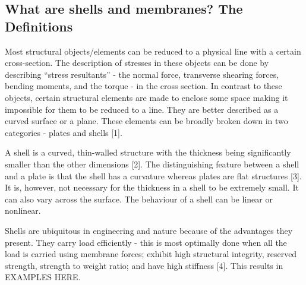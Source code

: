 \documentclass[../main.tex]{subfiles}
\begin{document}
\subsection{What are shells and membranes? The Definitions}
Most structural objects/elements can be reduced to a physical line with a certain cross-section. The description of stresses in these objects can be done by describing
 “stress resultants” - the normal force, transverse shearing forces, bending moments, and the torque - in the cross section. In contrast to these objects,
 certain structural elements are made to enclose some space making it impossible for them to be reduced to a line. They are better described as a curved surface or a plane.
 These elements can be broadly broken down in two categories - plates and shells [1].

A shell is a curved, thin-walled structure with the thickness being significantly smaller than the other dimensions [2]. The distinguishing
 feature between a shell and a plate is that the shell has a curvature whereas plates are flat structures [3]. It is, however, not necessary for the thickness
 in a shell to be extremely small. It can also vary across the surface. The behaviour of a shell can be linear or nonlinear.

Shells are ubiquitous in engineering and nature because of the advantages they present.
They carry load efficiently - this is most optimally done when all the load is carried using membrane forces; 
exhibit high structural integrity, reserved strength, strength to weight ratio; and have high stiffness [4]. 
This results in EXAMPLES HERE.
\end{document}
